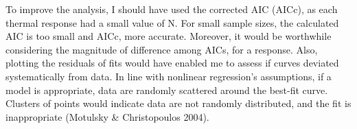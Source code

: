 \documentclass[11pt]{article}
\begin{document}
To improve the analysis, I should have used the corrected AIC (AICc), as each thermal response had a small value of N. For small sample sizes, the calculated AIC is too small and AICc, more accurate. Moreover, it would be worthwhile considering the magnitude of difference among AICs, for a response.
Also, plotting the residuals of fits would have enabled me to assess if curves deviated systematically from data. In line with nonlinear regression's assumptions, if a model is appropriate, data are randomly scattered around the best-fit curve. Clusters of points would indicate data are not randomly distributed, and the fit is inappropriate (Motulsky \& Christopoulos 2004).





\end{document}
